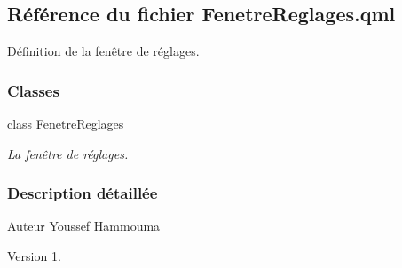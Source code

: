 \hypertarget{_fenetre_reglages_8qml}{}\subsection{Référence du fichier Fenetre\+Reglages.\+qml}
\label{_fenetre_reglages_8qml}


Définition de la fenêtre de réglages.  


\subsubsection*{Classes}
\begin{DoxyCompactItemize}
\item 
class \hyperlink{class_fenetre_reglages}{Fenetre\+Reglages}
\begin{DoxyCompactList}\small\item\em La fenêtre de réglages. \end{DoxyCompactList}\end{DoxyCompactItemize}


\subsubsection{Description détaillée}
\begin{DoxyAuthor}{Auteur}
Youssef Hammouma
\end{DoxyAuthor}
\begin{DoxyVersion}{Version}
1. 
\end{DoxyVersion}
